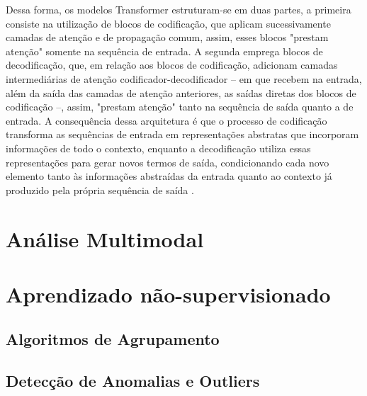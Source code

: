 Dessa forma, os modelos Transformer estruturam-se em duas partes, a primeira consiste na utilização de blocos de codificação, que aplicam sucessivamente camadas de atenção e de propagação comum, assim, esses blocos "prestam atenção" somente na sequência de entrada. A segunda emprega blocos de decodificação, que, em relação aos blocos de codificação, adicionam camadas intermediárias de atenção codificador-decodificador -- em que recebem na entrada, além da saída das camadas de atenção anteriores, as saídas diretas dos blocos de codificação --, assim, "prestam atenção" tanto na sequência de saída quanto a de entrada. A consequência dessa arquitetura é que o processo de codificação transforma as sequências de entrada em representações abstratas que incorporam informações de todo o contexto, enquanto a decodificação utiliza essas representações para gerar novos termos de saída, condicionando cada novo elemento tanto às informações abstraídas da entrada quanto ao contexto já produzido pela própria sequência de saída \cite{transformer}.

\section{Análise Multimodal}



\section{Aprendizado não-supervisionado}





\subsection{Algoritmos de Agrupamento}


\subsection{Detecção de Anomalias e Outliers}
